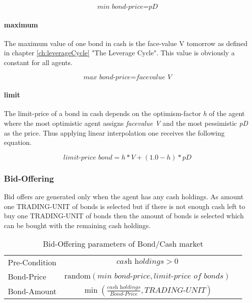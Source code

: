 \documentclass[Bachelorarbeit.tex]{subfiles}
\begin{document}
\begin{equation}
\textit{min bond-price} = \textit{pD}
\end{equation}
 
\paragraph{maximum}
The maximum value of one bond in cash is the face-value V tomorrow as defined in chapter \ref{ch:leverageCycle} "The Leverage Cycle". This value is obviously a constant for all agents.

\begin{equation}
\textit{max bond-price} = \textit{facevalue V}
\end{equation}

\paragraph{limit}
The limit-price of a bond in cash depends on the optimism-factor \textit{h} of the agent where the most optimistic agent assigns \textit{facevalue V} and the most pessimistic \textit{pD} as the price. Thus applying linear interpolation one receives the following equation.

\begin{equation}
\textit{limit-price bond} = h * V + ( 1.0 - h ) * pD
\end{equation}

\subsubsection{Bid-Offering}
Bid offers are generated only when the agent has any cash holdings. As amount one TRADING-UNIT of bonds is selected but if there is not enough cash left to buy one TRADING-UNIT of bonds then the amount of bonds is selected which can be bought with the remaining cash holdings.

\begin{table}[H]
	\centering
	\caption{Bid-Offering parameters of Bond/Cash market}
	\begin{tabular} { l c r }
		\hline
		Pre-Condition & $\textit{cash holdings} > 0$  \\
		Bond-Price & $\mathrm{random}(\textit{min bond-price}, \textit{limit-price of bonds})$ \\
		Bond-Amount & $\min (\frac{\textit{cash holdings} }{ \textit{Bond-Price} }, \textit{TRADING-UNIT} )$ \\
		\hline
	\end{tabular}
\end{table}
\end{document}
